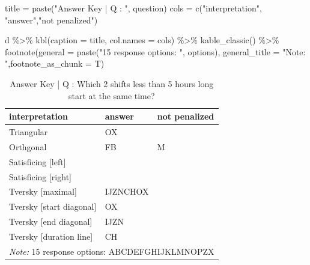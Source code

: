 \documentclass[
  letterpaper,
  DIV=11,
  numbers=noendperiod]{scrreprt}
\newenvironment{Shaded}{\begin{snugshade}}{\end{snugshade}}
\newcommand{\AttributeTok}[1]{\textcolor[rgb]{0.40,0.45,0.13}{#1}}
\newcommand{\FunctionTok}[1]{\textcolor[rgb]{0.28,0.35,0.67}{#1}}
\newcommand{\NormalTok}[1]{\textcolor[rgb]{0.00,0.23,0.31}{#1}}
\newcommand{\OtherTok}[1]{\textcolor[rgb]{0.00,0.23,0.31}{#1}}
\newcommand{\SpecialCharTok}[1]{\textcolor[rgb]{0.37,0.37,0.37}{#1}}
\newcommand{\StringTok}[1]{\textcolor[rgb]{0.13,0.47,0.30}{#1}}
\begin{document}
\begin{Shaded}
\begin{Highlighting}[]
\NormalTok{title }\OtherTok{=} \FunctionTok{paste}\NormalTok{(}\StringTok{"Answer Key | Q : "}\NormalTok{, question)}
\NormalTok{cols }\OtherTok{=} \FunctionTok{c}\NormalTok{(}\StringTok{"interpretation"}\NormalTok{, }\StringTok{"answer"}\NormalTok{,}\StringTok{"not penalized"}\NormalTok{)}

\NormalTok{d }\SpecialCharTok{\%\textgreater{}\%} \FunctionTok{kbl}\NormalTok{(}\AttributeTok{caption =}\NormalTok{ title, }\AttributeTok{col.names =}\NormalTok{ cols) }\SpecialCharTok{\%\textgreater{}\%} \FunctionTok{kable\_classic}\NormalTok{() }\SpecialCharTok{\%\textgreater{}\%}
  \FunctionTok{footnote}\NormalTok{(}\AttributeTok{general =} \FunctionTok{paste}\NormalTok{(}\StringTok{"15 response options: "}\NormalTok{, options), }\AttributeTok{general\_title =} \StringTok{"Note: "}\NormalTok{,}\AttributeTok{footnote\_as\_chunk =}\NormalTok{ T)}
\end{Highlighting}
\end{Shaded}

\begin{table}

\caption{Answer Key | Q :  Which 2 shifts less than 5 hours long start at the same time?}
\centering
\begin{tabular}[t]{l|l|l}
\hline
interpretation & answer & not penalized\\
\hline
Triangular & OX & \\
\hline
Orthgonal & FB & M\\
\hline
Satisficing [left] &  & \\
\hline
Satisficing [right] &  & \\
\hline
Tversky [maximal] & IJZNCHOX & \\
\hline
Tversky [start diagonal] & OX & \\
\hline
Tversky [end diagonal] & IJZN & \\
\hline
Tversky [duration line] & CH & \\
\hline
\multicolumn{3}{l}{\rule{0pt}{1em}\textit{Note: } 15 response options:  ABCDEFGHIJKLMNOPZX}\\
\end{tabular}
\end{table}
\end{document}
